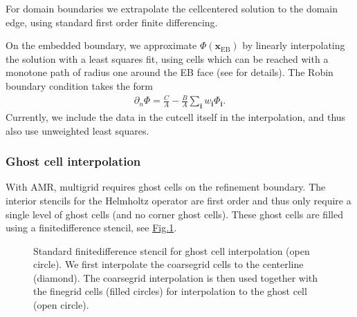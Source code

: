 \documentclass[letterpaper,10pt,english]{sphinxmanual}
\let\sphinxpxdimen\pdfpxdimen\else\newdimen\sphinxpxdimen
\begin{document}
For domain boundaries we extrapolate the cell\sphinxhyphen{}centered solution to the domain edge, using standard first order finite differencing.

On the embedded boundary, we approximate \(\Phi\left(\mathbf{x}_{\text{EB}}\right)\) by linearly interpolating the solution with a least squares fit, using cells which can be reached with a monotone path of radius one around the EB face (see {\hyperref[\detokenize{Utilities/LeastSquares:chap-leastsquares}]{}} for details).
The Robin boundary condition takes the form
\begin{equation*}
\begin{split}\partial_n\Phi = \frac{C}{A} - \frac{B}{A}\sum_{\mathbf{i}} w_{\mathbf{i}}\Phi_{\mathbf{i}}.\end{split}
\end{equation*}
Currently, we include the data in the cut\sphinxhyphen{}cell itself in the interpolation, and thus also use unweighted least squares.


\subsubsection{Ghost cell interpolation}
\label{\detokenize{Source/LinearSolvers:ghost-cell-interpolation}}\label{\detokenize{Source/LinearSolvers:chap-multigridinterpolation}}
With AMR, multigrid requires ghost cells on the refinement boundary.
The interior stencils for the Helmholtz operator are first order and thus only require a single level of ghost cells (and no corner ghost cells).
These ghost cells are filled using a finite\sphinxhyphen{}difference stencil, see \hyperref[\detokenize{Source/LinearSolvers:fig-multigridinterpolation}]{Fig.\@ \ref{\detokenize{Source/LinearSolvers:fig-multigridinterpolation}}}.

\begin{figure}[htb]
\centering
\capstart

\noindent\sphinxincludegraphics[width=360\sphinxpxdimen]{{MultigridInterpolation}.png}
\caption{Standard finite\sphinxhyphen{}difference stencil for ghost cell interpolation (open circle).
We first interpolate the coarse\sphinxhyphen{}grid cells to the centerline (diamond).
The coarse\sphinxhyphen{}grid interpolation is then used together with the fine\sphinxhyphen{}grid cells (filled circles) for interpolation to the ghost cell (open circle).}\label{\detokenize{Source/LinearSolvers:id4}}\label{\detokenize{Source/LinearSolvers:fig-multigridinterpolation}}\end{figure}
\end{document}
